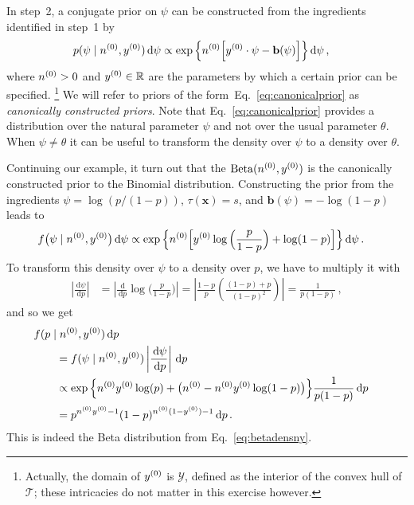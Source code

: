 \documentclass[12pt,a4paper	,twoside]{article}
\newcommand{\reals}{\mathbb{R}}
\newcommand{\dd}{\,\mathrm{d}}
\newcommand{\mbf}[1]{\mathbf{#1}}
\newcommand{\bs}[1]{\boldsymbol{#1}}
\renewcommand{\vec}[1]{{\bs#1}}
\newcommand{\be}{\operatorname{Beta}}
\begin{document}
In step~2, a conjugate prior on $\psi$ can be constructed from the ingredients identified in step~1 by
\begin{align}
p(\psi \mid \nz, \yz) \dd\psi
 &\propto \exp\Big\{ \nz \Big[ \yz \cdot \psi - \mbf{b}(\psi) \Big] \Big\} \dd\psi\,,
\label{eq:canonicalprior}
\end{align}
where $n^{(0)} > 0$ and $\yz \in \reals$ are the parameters by which a certain prior can be specified.%
\footnote{Actually, the domain of $y^{(0)}$ is $\mathcal{Y}$, defined as the interior of the convex hull of $\mathcal{T}$;
these intricacies do not matter in this exercise however.}
We will refer to priors of the form~Eq.~\eqref{eq:canonicalprior} as \emph{canonically constructed priors}.
Note that Eq.~\eqref{eq:canonicalprior} provides a distribution over the natural parameter $\psi$ and not over the usual parameter $\theta$.
When $\psi \neq \theta$ it can be useful to transform the density over $\psi$ to a density over $\theta$.

Continuing our example, it turn out that
the $\be(\nz,\yz)$ is the canonically constructed prior to the Binomial distribution.
Constructing the prior from the ingredients $\psi = \log(p/(1-p))$, $\tau(\vec{x}) = s$, and $\mbf{b}(\psi) = -\log(1-p)$ leads to
\begin{align}
f\big(\psi \mid \nz, \yz\big) \dd\psi %
 &\propto \exp\Big\{ \nz \Big[ \yz \log\Big(\frac{p}{1-p}\Big) + \log(1-p) \Big] \Big\} \dd\psi\,.
\end{align}
To transform this density over $\psi$ to a density over $p$,
we have to multiply it with
\begin{align}
\left|\frac{\dd\psi}{\dd p}\right|
 &= \left|\frac{\dd}{\dd p} \log\Big(\frac{p}{1-p}\Big)\right|
  = \left| \frac{1-p}{p}\left(\frac{(1-p)+p}{(1-p)^2}\right) \right|
  = \frac{1}{p(1-p)}\,,
\end{align}
and so we get
\begin{align}
\lefteqn{f(p\mid \nz, \yz)\dd p} \qquad \\  
 &= f(\psi\mid \nz, \yz) \left|\frac{\dd\psi}{\dd p}\right| \dd p\\
 &\propto \exp\Big\{ \nz\yz\log(p) + \big(\nz - \nz\yz\log(1-p)\big)\Big\} \frac{1}{p(1-p)}\dd p\\
 &= p^{\nz\yz - 1} (1-p)^{\nz(1-\yz) - 1} \dd p\,.
\end{align}
This is indeed the Beta distribution from Eq.~\eqref{eq:betadensny}.%
\end{document}
